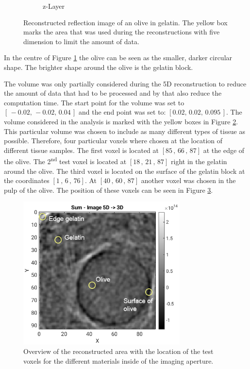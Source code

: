 \begin{figure}[H]
\begin{subfigure}[b]{0.55\textwidth}
         \caption{z-Layer}
         \label{fig:res:reflec_image_olive_xyz_z}
     \end{subfigure}
        \caption{Reconstructed reflection image of an olive in gelatin. The yellow box marks the area that was used during the reconstructions with five dimension to limit the amount of data.}
        \label{fig:res:reflec_image_olive_xyz}
\end{figure}


In the centre of Figure \ref{fig:res:reflec_image_olive_xyz_z} the olive can be seen as the smaller, darker circular shape. The brighter shape around the olive is the gelatin block. 

\bigskip


The volume was only partially considered during the 5D reconstruction to reduce the amount of data that had to be processed and by that also reduce the computation time. The start point for the volume was set to $[\, -0.02,\, -0.02,\, 0.04\, ]$ and the end point was set to: $[ 0.02,\, 0.02,\, 0.095\, ]$. The volume considered in the analysis is marked with the yellow boxes in Figure \ref{fig:res:reflec_image_olive_xyz}. This particular volume was chosen to include as many different types of tissue as possible. Therefore, four particular voxels where chosen at the location of different tissue samples. The first voxel is located at $[85\, , \, 66\, , \, 87]$ at the edge of the olive. The 2\textsuperscript{nd} test voxel is located at $[18\, , \, 21\, , \, 87]$ right in the gelatin around the olive. The third voxel is located on the surface of the gelatin block at the coordinates $[1\, , \, 6\, , \, 76]$. At $[40\, , \, 60\, , \, 87]$ another voxel was chosen in the pulp of the olive. The position of these voxels can be seen in Figure \ref{fig:different_tisue_types}.  
      
      
      
\begin{figure}[H]
    \centering
    \includegraphics[width=0.76\textwidth]{Graphics/Results/Variance_Image/stone_skin_pulp_location.png}
    \caption{Overview of the reconstructed area with the location of the test voxels for the different materials inside of the imaging aperture.}
    \label{fig:different_tisue_types}
\end{figure}
    
